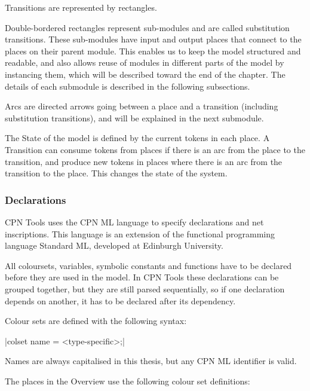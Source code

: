 	Transitions are represented by rectangles.
	
	Double-bordered rectangles represent sub-modules and are called substitution
	transitions. These sub-modules have input and output places
	that connect to the places on their parent module. This enables us to keep
	the model structured and readable, and also allows reuse of modules in
	different parts of the model by instancing them, which will be described toward
	the end of the chapter. The details of each submodule is described in the
	following subsections.
	
	Arcs are directed arrows going between a place and a transition (including
	substitution transitions), and will be explained in the next
	submodule. 
	
	The State of the model is defined by the current tokens in
	each place. A Transition can consume tokens from places if there is an arc from
	the place to the transition, and produce new tokens in places where there is an
	arc from the transition to the place. This changes the state of the system.
	
	
	\subsubsection{Declarations}
	
	CPN Tools uses the CPN ML language to specify declarations and net inscriptions.
	This language is an extension of the functional programming language Standard
	ML, developed at Edinburgh University.
	
	All coloursets, variables, symbolic constants and functions have to be declared
	before they are used in the model. In CPN Tools these declarations can be
	grouped together, but they are still parsed sequentially, so if one declaration
	depends on another, it has to be declared after its dependency.

	Colour sets are defined with the following syntax:
	
	|colset name = <type-specific>;|
	
	Names are always capitalised in this thesis, but any CPN ML identifier is
	valid.
	
	The places in the Overview use the following colour set definitions:
	
